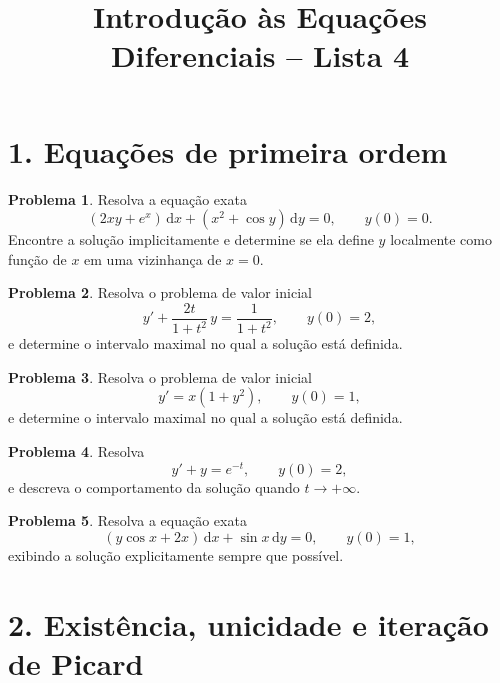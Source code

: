 \documentclass[10pt,a4paper]{amsart}
\title{Introdução às Equações Diferenciais -- Lista 4}
\renewcommand{\d}{\mathrm{d}}
\theoremstyle{definition}
\newtheorem{problema}{Problema}
\begin{document}
\maketitle


\vspace{4mm}

\section*{1. Equações de primeira ordem}

\begin{problema}
Resolva a equação exata
\[
    (2xy+e^x)\,\d x+(x^2+\cos y)\,\d y=0,
    \qquad y(0)=0.
\]
Encontre a solução implicitamente e determine se ela define $y$ localmente
como função de $x$ em uma vizinhança de $x=0$.
\end{problema}

\begin{problema}
Resolva o problema de valor inicial
\[
    y'+\frac{2t}{1+t^2}\,y=\frac{1}{1+t^2},
    \qquad y(0)=2,
\]
e determine o intervalo maximal no qual a solução está definida.
\end{problema}

\begin{problema}
Resolva o problema de valor inicial
\[
    y'=x(1+y^2),
    \qquad y(0)=1,
\]
e determine o intervalo maximal no qual a solução está definida.
\end{problema}

\begin{problema}
Resolva
\[
    y'+y=e^{-t},
    \qquad y(0)=2,
\]
e descreva o comportamento da solução quando $t\to+\infty$.
\end{problema}

\begin{problema}
Resolva a equação exata
\[
    (y\cos x+2x)\,\d x+\sin x\,\d y=0,
    \qquad y(0)=1,
\]
exibindo a solução explicitamente sempre que possível.
\end{problema}

\section*{2. Existência, unicidade e iteração de Picard}
\end{document}
